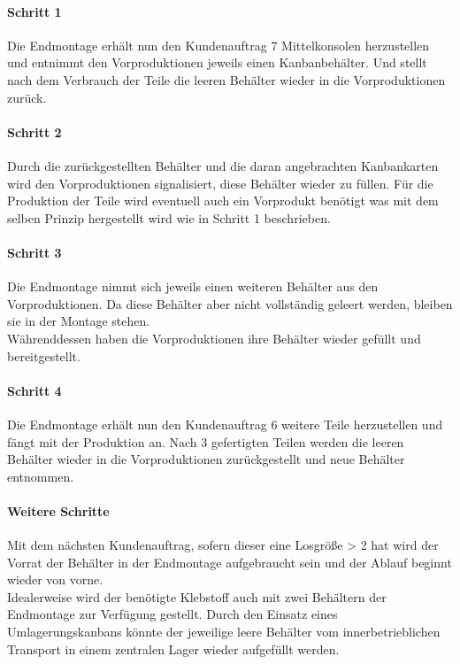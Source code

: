 \documentclass[00_ToyotaProduktionssystem.tex]{subfiles}
\begin{document}
\paragraph{Schritt 1}
Die Endmontage erhält nun den Kundenauftrag 7 Mittelkonsolen herzustellen und entnimmt den Vorproduktionen jeweils einen Kanbanbehälter. Und stellt nach dem Verbrauch der Teile die leeren Behälter wieder in die Vorproduktionen zurück.

\paragraph{Schritt 2}
Durch die zurückgestellten Behälter und die daran angebrachten Kanbankarten wird den Vorproduktionen signalisiert, diese Behälter wieder zu füllen. Für die Produktion der Teile wird eventuell auch ein Vorprodukt benötigt was mit dem selben Prinzip hergestellt wird wie in Schritt 1 beschrieben.

\paragraph{Schritt 3}
Die Endmontage nimmt sich jeweils einen weiteren Behälter aus den Vorproduktionen. Da diese Behälter aber nicht vollständig geleert werden, bleiben sie in der Montage stehen.\\
Währenddessen haben die Vorproduktionen ihre Behälter wieder gefüllt und bereitgestellt.

\paragraph{Schritt 4}
Die Endmontage erhält nun den Kundenauftrag 6 weitere Teile herzustellen und fängt mit der Produktion an. Nach 3 gefertigten Teilen werden die leeren Behälter wieder in die Vorproduktionen zurückgestellt und neue Behälter entnommen.

\paragraph{Weitere Schritte}
Mit dem nächsten Kundenauftrag, sofern dieser eine Losgröße > 2 hat wird der Vorrat der Behälter in der Endmontage aufgebraucht sein und der Ablauf beginnt wieder von vorne.\\
Idealerweise wird der benötigte Klebstoff auch mit zwei Behältern der Endmontage zur Verfügung gestellt. Durch den Einsatz eines Umlagerungskanbans könnte der jeweilige leere Behälter vom innerbetrieblichen Transport in einem zentralen Lager wieder aufgefüllt werden.
\end{document}
